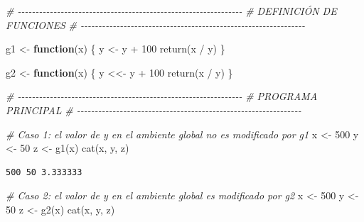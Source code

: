 \documentclass[
]{book}
\newenvironment{Shaded}{\begin{snugshade}}{\end{snugshade}}
\newcommand{\CommentTok}[1]{\textcolor[rgb]{0.56,0.35,0.01}{\textit{#1}}}
\newcommand{\ControlFlowTok}[1]{\textcolor[rgb]{0.13,0.29,0.53}{\textbf{#1}}}
\newcommand{\DecValTok}[1]{\textcolor[rgb]{0.00,0.00,0.81}{#1}}
\newcommand{\FunctionTok}[1]{\textcolor[rgb]{0.00,0.00,0.00}{#1}}
\newcommand{\NormalTok}[1]{#1}
\newcommand{\OtherTok}[1]{\textcolor[rgb]{0.56,0.35,0.01}{#1}}
\newcommand{\SpecialCharTok}[1]{\textcolor[rgb]{0.00,0.00,0.00}{#1}}
\begin{document}
\begin{Shaded}
\begin{Highlighting}[]
\CommentTok{\# {-}{-}{-}{-}{-}{-}{-}{-}{-}{-}{-}{-}{-}{-}{-}{-}{-}{-}{-}{-}{-}{-}{-}{-}{-}{-}{-}{-}{-}{-}{-}{-}{-}{-}{-}{-}{-}{-}{-}{-}{-}{-}{-}{-}{-}{-}{-}{-}{-}{-}{-}{-}{-}{-}{-}{-}{-}{-}{-}{-}{-}{-}{-}}
\CommentTok{\# DEFINICIÓN DE FUNCIONES}
\CommentTok{\# {-}{-}{-}{-}{-}{-}{-}{-}{-}{-}{-}{-}{-}{-}{-}{-}{-}{-}{-}{-}{-}{-}{-}{-}{-}{-}{-}{-}{-}{-}{-}{-}{-}{-}{-}{-}{-}{-}{-}{-}{-}{-}{-}{-}{-}{-}{-}{-}{-}{-}{-}{-}{-}{-}{-}{-}{-}{-}{-}{-}{-}{-}{-}}

\NormalTok{g1 }\OtherTok{\textless{}{-}} \ControlFlowTok{function}\NormalTok{(x) \{}
\NormalTok{    y }\OtherTok{\textless{}{-}}\NormalTok{ y }\SpecialCharTok{+} \DecValTok{100}
    \FunctionTok{return}\NormalTok{(x }\SpecialCharTok{/}\NormalTok{ y)}
\NormalTok{\}}

\NormalTok{g2 }\OtherTok{\textless{}{-}} \ControlFlowTok{function}\NormalTok{(x) \{}
\NormalTok{    y }\OtherTok{\textless{}\textless{}{-}}\NormalTok{ y }\SpecialCharTok{+} \DecValTok{100}
    \FunctionTok{return}\NormalTok{(x }\SpecialCharTok{/}\NormalTok{ y)}
\NormalTok{\}}

\CommentTok{\# {-}{-}{-}{-}{-}{-}{-}{-}{-}{-}{-}{-}{-}{-}{-}{-}{-}{-}{-}{-}{-}{-}{-}{-}{-}{-}{-}{-}{-}{-}{-}{-}{-}{-}{-}{-}{-}{-}{-}{-}{-}{-}{-}{-}{-}{-}{-}{-}{-}{-}{-}{-}{-}{-}{-}{-}{-}{-}{-}{-}{-}{-}{-}}
\CommentTok{\# PROGRAMA PRINCIPAL}
\CommentTok{\# {-}{-}{-}{-}{-}{-}{-}{-}{-}{-}{-}{-}{-}{-}{-}{-}{-}{-}{-}{-}{-}{-}{-}{-}{-}{-}{-}{-}{-}{-}{-}{-}{-}{-}{-}{-}{-}{-}{-}{-}{-}{-}{-}{-}{-}{-}{-}{-}{-}{-}{-}{-}{-}{-}{-}{-}{-}{-}{-}{-}{-}{-}{-}}

\CommentTok{\# Caso 1: el valor de y en el ambiente global no es modificado por g1}
\NormalTok{x }\OtherTok{\textless{}{-}} \DecValTok{500}
\NormalTok{y }\OtherTok{\textless{}{-}} \DecValTok{50}
\NormalTok{z }\OtherTok{\textless{}{-}} \FunctionTok{g1}\NormalTok{(x)}
\FunctionTok{cat}\NormalTok{(x, y, z)}
\end{Highlighting}
\end{Shaded}

\begin{verbatim}
500 50 3.333333
\end{verbatim}

\begin{Shaded}
\begin{Highlighting}[]
\CommentTok{\# Caso 2: el valor de y en el ambiente global es modificado por g2}
\NormalTok{x }\OtherTok{\textless{}{-}} \DecValTok{500}
\NormalTok{y }\OtherTok{\textless{}{-}} \DecValTok{50}
\NormalTok{z }\OtherTok{\textless{}{-}} \FunctionTok{g2}\NormalTok{(x)}
\FunctionTok{cat}\NormalTok{(x, y, z)}
\end{Highlighting}
\end{Shaded}
\end{document}

